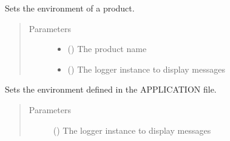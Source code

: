 \documentclass[a4paper,10pt,english]{sphinxmanual}
\begin{document}
\begin{fulllineitems}
\begin{fulllineitems}
\end{fulllineitems}


\begin{fulllineitems}
\label{\detokenize{commands/apidoc/src:src.environment.SalomeEnviron.set_a_product}}
Sets the environment of a product.
\begin{quote}\begin{description}
\item[{Parameters}] \leavevmode\begin{itemize}
\item {} 
 () \textendash{} The product name

\item {} 
 () \textendash{} The logger instance to display messages

\end{itemize}

\end{description}\end{quote}

\end{fulllineitems}


\begin{fulllineitems}
\label{\detokenize{commands/apidoc/src:src.environment.SalomeEnviron.set_application_env}}
Sets the environment defined in the APPLICATION file.
\begin{quote}\begin{description}
\item[{Parameters}] \leavevmode
{} () \textendash{} The logger instance to display messages

\end{description}\end{quote}

\end{fulllineitems}


\end{fulllineitems}
\end{document}
